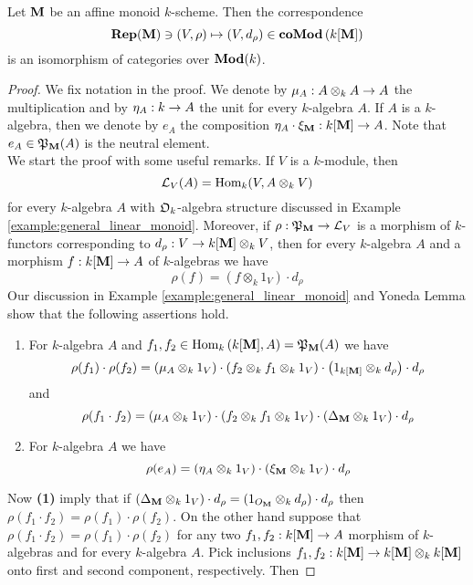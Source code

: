 \begin{theorem}\label{theorem:comodules_equivalent_to_representations}
Let $\mathbf{M}$ be an affine monoid $k$-scheme. Then the correspondence
$$\mathbf{Rep}(\mathbf{M}) \ni \left(V,\rho\right) \mapsto \left(V,d_{\rho}\right)\in \mathbf{coMod}\left(k[\mathbf{M}]\right)$$
is an isomorphism of categories over $\mathbf{Mod}(k)$.
\end{theorem}
\begin{proof}
We fix notation in the proof. We denote by $\mu_A:A\otimes_kA\rightarrow A$ the multiplication and by $\eta_A:k\rightarrow A$ the unit for every $k$-algebra $A$. If $A$ is a $k$-algebra, then we denote by $e_A$ the composition $\eta_A \cdot \xi_{\mathbf{M}}:k[\mathbf{M}]\rightarrow A$. Note that $e_A\in {\mathfrak P}_{\mathbf{M}}(A)$ is the neutral element.\\
We start the proof with some useful remarks. If $V$ is a $k$-module, then
$${\mathcal L}_V(A) = \mathrm{Hom}_k(V,A\otimes_kV)$$
for every $k$-algebra $A$ with ${\mathfrak O}_k$-algebra structure discussed in Example \ref{example:general_linear_monoid}. Moreover, if $\rho:{\mathfrak P}_{\mathbf{M}}\rightarrow {\mathcal L}_V$ is a morphism of $k$-functors corresponding to $d_{\rho}:V\rightarrow k[\mathbf{M}]\otimes_kV$, then for every $k$-algebra $A$ and a morphism $f:k[\mathbf{M}]\rightarrow A$ of $k$-algebras we have
$$\rho(f) = \left(f\otimes_k1_V\right)\cdot d_{\rho}$$
Our discussion in Example \ref{example:general_linear_monoid} and Yoneda Lemma show that the following assertions hold.
\begin{enumerate}[label=\textbf{(\arabic*)}, leftmargin=1.5em]
\item For $k$-algebra $A$ and $f_1,f_2\in \mathrm{Hom}_k\left(k[\mathbf{M}],A\right) = {\mathfrak P}_{\mathbf{M}}(A)$ we have
$$\rho(f_1)\cdot \rho(f_2) = \left(\mu_A\otimes_k1_V\right)\cdot \left(f_2\otimes_kf_1\otimes_k1_V\right) \cdot \left(1_{k[\mathbf{M}]}\otimes_k d_{\rho}\right) \cdot d_{\rho}$$
and
$$\rho(f_1\cdot f_2)=\left(\mu_A\otimes_k1_V\right)\cdot \left(f_2\otimes_kf_1\otimes_k1_V \right)\cdot \left(\Delta_{\mathbf{M}}\otimes_k 1_V\right)\cdot d_{\rho}$$
\item For $k$-algebra $A$ we have
$$\rho(e_A) = \left(\eta_A\otimes_k 1_V\right)\cdot \left(\xi_{\mathbf{M}}\otimes_k 1_V\right) \cdot d_{\rho}$$
\end{enumerate}
Now \textbf{(1)} imply that if $\left(\Delta_{\mathbf{M}}\otimes_{k}1_V\right)\cdot d_{\rho}=\left(1_{O_{\mathbf{M}}}\otimes_{k}d_{\rho}\right)\cdot d_{\rho}$
then $\rho(f_1\cdot f_2) = \rho(f_1)\cdot \rho(f_2)$. On the other hand suppose that $\rho(f_1\cdot f_2) = \rho(f_1)\cdot \rho(f_2)$ for any two $f_1,f_2:k[\mathbf{M}]\rightarrow A$ morphism of $k$-algebras and for every $k$-algebra $A$. Pick inclusions $f_1,f_2:k[\mathbf{M}]\rightarrow k[\mathbf{M}]\otimes_kk[\mathbf{M}]$ onto first and second component, respectively. Then

\end{proof}
